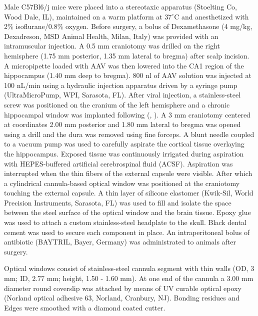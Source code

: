 Male C57Bl6/j mice were placed into a stereotaxic apparatus (Stoelting Co, Wood Dale, IL), maintained on a warm platform at $37^{\circ}$C and anesthetized with 2\% isoflurane/0.8\% oxygen. 
Before surgery, a bolus of Dexamethasone (4 mg/kg, Dexadreson, MSD Animal Health, Milan, Italy) was provided with an intramuscular injection. 
A 0.5 mm craniotomy was drilled on the right hemisphere (1.75 mm posterior, 1.35 mm lateral to bregma) after scalp incision. 
A micropipette loaded with AAV was then lowered into the CA1 region of the hippocampus (1.40 mm deep to bregma). 
800 nl of AAV solution was injected at 100 nL/min using a hydraulic injection apparatus driven by a syringe pump (UltraMicroPump, WPI, Sarasota, FL). 
After viral injection, a stainless-steel screw was positioned on the cranium of the left hemisphere and a chronic hippocampal window was implanted following (\cite{dombeck2010}, \cite{sheffield2015}). 
A 3 mm craniotomy centered at coordinates 2.00 mm posterior and 1.80 mm lateral to bregma was opened using a drill and the dura was removed using fine forceps. 
A blunt needle coupled to a vacuum pump was used to carefully aspirate the cortical tissue overlaying the hippocampus. 
Exposed tissue was continuously irrigated during aspiration with HEPES-buffered artificial cerebrospinal fluid (ACSF). 
Aspiration was interrupted when the thin fibers of the external capsule were visible. 
After which a cylindrical cannula-based optical window was positioned at the craniotomy touching the external capsule. 
A thin layer of silicone elastomer (Kwik-Sil, World Precision Instruments, Sarasota, FL) was used to fill and isolate the space between the steel surface of the optical window and the brain tissue. 
Epoxy glue was used to attach a custom stainless-steel headplate to the skull.
Black dental cement was used to secure each component in place.
An intraperitoneal bolus of antibiotic (BAYTRIL, Bayer, Germany) was administrated to animals after surgery.

Optical windows consist of stainless-steel cannula segment with thin walls (OD, 3 mm; ID, 2.77 mm; height, 1.50 - 1.60 mm). 
At one end of the cannula a 3.00 mm diameter round coverslip was attached by means of UV curable optical epoxy (Norland optical adhesive 63, Norland, Cranbury, NJ). 
Bonding residues and Edges were smoothed with a diamond coated cutter.

